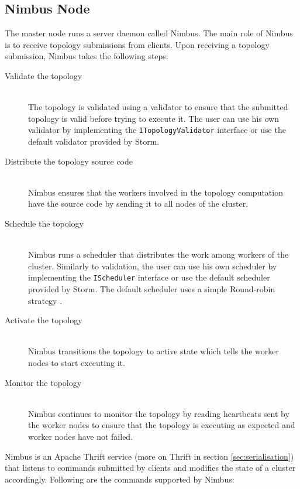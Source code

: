 \documentclass[bsc,logo,frontabs,twoside,singlespacing,normalheadings,parskip]{infthesis}\usepackage[]{graphicx}\usepackage[]{color}
\begin{document}
\subsection{Nimbus Node}

The master node runs a server daemon called Nimbus. The main role of Nimbus is to receive topology submissions from clients. Upon receiving a topology submission, Nimbus takes the following steps:

\begin{description}
	\item[Validate the topology] \hfill \\
	The topology is validated using a validator to ensure that the submitted topology is valid before trying to execute it. The user can use his own validator by implementing the \texttt{ITopologyValidator} interface or use the default validator provided by Storm.
	\item[Distribute the topology source code] \hfill \\
	Nimbus ensures that the workers involved in the topology computation have the source code by sending it to all nodes of the cluster.
	\item[Schedule the topology] \hfill \\
	Nimbus runs a scheduler that distributes the work among workers of the cluster. Similarly to validation, the user can use his own scheduler by implementing the \texttt{IScheduler} interface or use the default scheduler provided by Storm. The default scheduler uses a simple Round-robin strategy \citep{Aniello_Baldoni_Querzoni_2013}.
	\item[Activate the topology] \hfill \\
	Nimbus transitions the topology to active state which tells the worker nodes to start executing it.
	\item[Monitor the topology] \hfill \\
	Nimbus continues to monitor the topology by reading heartbeats sent by the worker nodes to ensure that the topology is executing as expected and worker nodes have not failed.
\end{description}


Nimbus is an Apache Thrift \cite{ApacheThrift} service (more on Thrift in section \ref{sec:serialisation}) that listens to commands submitted by clients and modifies the state of a cluster accordingly. Following are the commands supported by Nimbus:
\end{document}

